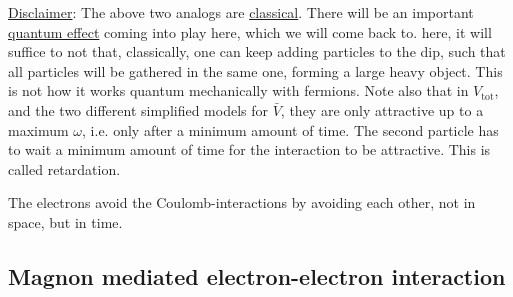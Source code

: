 \underline{Disclaimer}: The above two analogs are \underline{classical}. There will be an important \underline{quantum effect} coming into play here, which we will come back to. here, it will suffice to not that, classically, one can keep adding particles to the dip, such that all particles will be gathered in the same one, forming a large heavy object. This is not how it works quantum mechanically with fermions. Note also that in $V_{\text{tot}}$, and the two different simplified models for $\bar V$, they are only attractive up to a maximum $\omega$, i.e. only after a minimum amount of time. The second particle has to wait a minimum amount of time for the interaction to be attractive. This is called retardation. 
\begin{tcolorbox}
	The electrons avoid the Coulomb-interactions by avoiding each other, not in space, but in time. 
\end{tcolorbox}

\subsection{Magnon mediated electron-electron interaction}
